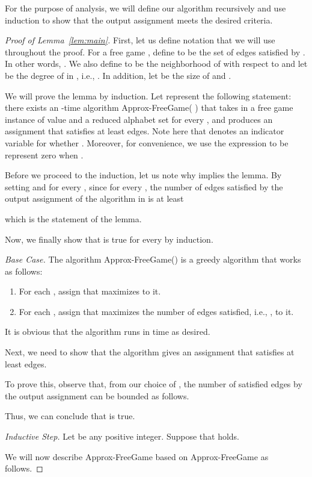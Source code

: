 \documentclass{article}
\begin{document}
For the purpose of analysis, we will define our algorithm recursively and use induction to show that the output assignment meets the desired criteria.

\begin{proof}[Proof of Lemma~\ref{lem:main}]
First, let us define notation that we will use throughout the proof. For a free game , define  to be the set of edges satisfied by . In other words, . We also define  to be the neighborhood of  with respect to  and let  be the degree of  in , i.e., . In addition, let  be the size of  and .

We will prove the lemma by induction. Let  represent the following statement: there exists an -time algorithm {\sc Approx-FreeGame}( ) that takes in a free game instance  of value  and a reduced alphabet set  for every , and produces an assignment that satisfies at least  edges. Note here that  denotes an indicator variable for whether . Moreover, for convenience, we use the expression  to be represent zero when .

Before we proceed to the induction, let us note why  implies the lemma. By setting  and  for every , since  for every , the number of edges satisfied by the output assignment of the algorithm in  is at least

which is the statement of the lemma.

Now, we finally show that  is true for every  by induction.

{\em Base Case.} The algorithm {\sc Approx-FreeGame}() is a greedy algorithm that works as follows:
\begin{enumerate}
  \item For each , assign  that maximizes  to it. \label{step:free-greedy}
  \item For each , assign  that maximizes the number of edges satisfied, i.e., , to it.
\end{enumerate}

It is obvious that the algorithm runs in  time as desired.

Next, we need to show that the algorithm gives an assignment that satisfies at least  edges.

To prove this, observe that, from our choice of , the number of satisfied edges by the output assignment can be bounded as follows.


Thus, we can conclude that  is true.

{\em Inductive Step.} Let  be any positive integer. Suppose that  holds.

We will now describe {\sc Approx-FreeGame} based on {\sc Approx-FreeGame} as follows.


\end{proof}
\end{document}
